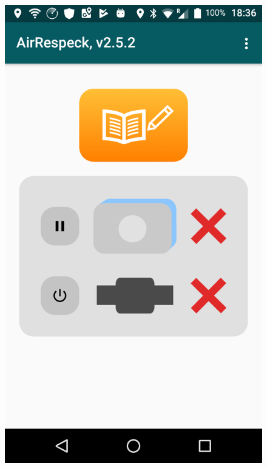 \begin{figure}[H] 
 
  \begin{minipage}[b]{0.5\linewidth}
    \centering
    \includegraphics[width=.8\linewidth]{images/main_before} 
    \vspace{3ex}
  \end{minipage}%
  \begin{minipage}[b]{0.5\linewidth}
    \centering

\end{minipage}
\end{figure}
